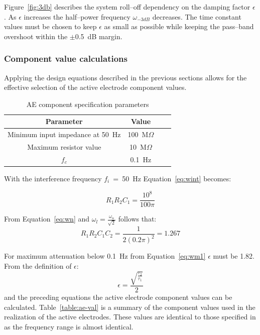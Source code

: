 Figure~\vref{fig:3db} describes the system roll--off dependency on the
damping factor $\epsilon$. As $\epsilon$ increases the half--power
frequency $\omega_{-3dB}$ decreases. The time constant values must be
chosen to keep $\epsilon$ as small as possible while keeping the
pass--band overshoot within the $\pm$0.5~dB margin.

\subsubsection{Component value calculations}
\label{section:comp-values}
Applying the design equations described in the previous sections
allows for the effective selection of the active electrode component
values.

\begin{table}
\begin{center}	
	\begin{tabular}[htpb]{|c|c|c|c|} \hline
	Parameter & Value \\ \hline
	Minimum input impedance at 50~Hz & 100~M$\Omega$ \\
	Maximum resistor value & 10~M$\Omega$ \\ 
	$f_c$ & 0.1~Hz \\
	\hline
	\end{tabular}
	\caption{AE component specification parameters}
	\label{table:ae-specs}
\end{center}	
\end{table}

With the interference frequency $f_i$~=~50~Hz Equation~\ref{eq:wint}
becomes:

\begin{equation}
	R_1R_2C_1 = \frac{10^8}{100\pi} 
\end{equation}

From Equation~\ref{eq:wn} and $\omega_l = \frac{\omega_n}{\sqrt{2}}$
follows that:
\begin{equation}
	R_1R_2C_1C_2 = \frac{1}{2(0.2\pi)^2} = 1.267 
\end{equation}

For maximum attenuation below 0.1~Hz from Equation~\ref{eq:wm1}
$\epsilon$ must be 1.82. From the definition of $\epsilon$:
\begin{equation}
 	\epsilon =
	\frac{\sqrt{\frac{\tau_2}{\tau_1}}}{2}
\end{equation}
and the preceding equations the active electrode component values can
be calculated. Table~\vref{table:ae-val} is a summary of the component
values used in the realization of the active electrodes. These values
are identical to those specified in \cite{buffer} as the frequency
range is almost identical.

